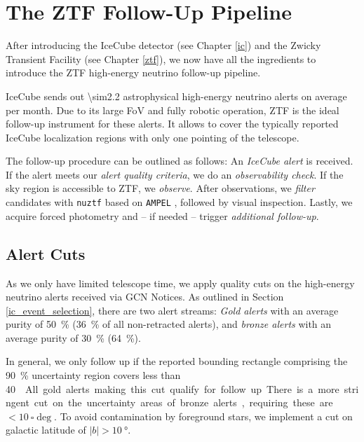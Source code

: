 \chapter{The ZTF Follow-Up Pipeline} \label{fupipeline}
After introducing the IceCube detector (see Chapter \ref{ic}) and the Zwicky Transient Facility (see Chapter \ref{ztf}), we now have all the ingredients to introduce the ZTF high-energy neutrino follow-up pipeline.

IceCube sends out \num{\sim2.2} astrophysical high-energy neutrino alerts on average per month. Due to its large FoV and fully robotic operation, ZTF is the ideal follow-up instrument for these alerts. It allows to cover the typically reported IceCube localization regions with only one pointing of the telescope.

The follow-up procedure can be outlined as follows: An \textit{IceCube alert} is received. If the alert meets our \textit{alert quality criteria}, we do an \textit{observability check}. If the sky region is accessible to ZTF, we \textit{observe}. After observations, we \textit{filter} candidates with \texttt{nuztf} based on \texttt{AMPEL} , followed by visual inspection. Lastly, we acquire forced photometry and -- if needed -- trigger \textit{additional follow-up}.

\section{Alert Cuts}\label{alert_cuts}
As we only have limited telescope time, we apply quality cuts on the high-energy neutrino alerts received via GCN Notices. As outlined in Section \ref{ic_event_selection}, there are two alert streams: \textit{Gold alerts} with an average purity of \SI{50}{\percent} (\SI{36}{\percent} of all non-retracted alerts), and \textit{bronze alerts} with an average purity of \SI{30}{\percent} (\SI{64}{\percent}).

In general, we only follow up if the reported bounding rectangle comprising the \SI{90}{\percent} uncertainty region covers less than \SI{40}{\square\deg}. All gold alerts making this cut qualify for follow up. There is a more stringent cut on the uncertainty areas of bronze alerts, requiring these are $<\SI{10}{\square\deg}$. To avoid contamination by foreground stars, we implement a cut on galactic latitude of $|b|>\SI{10}{\degree}$.

